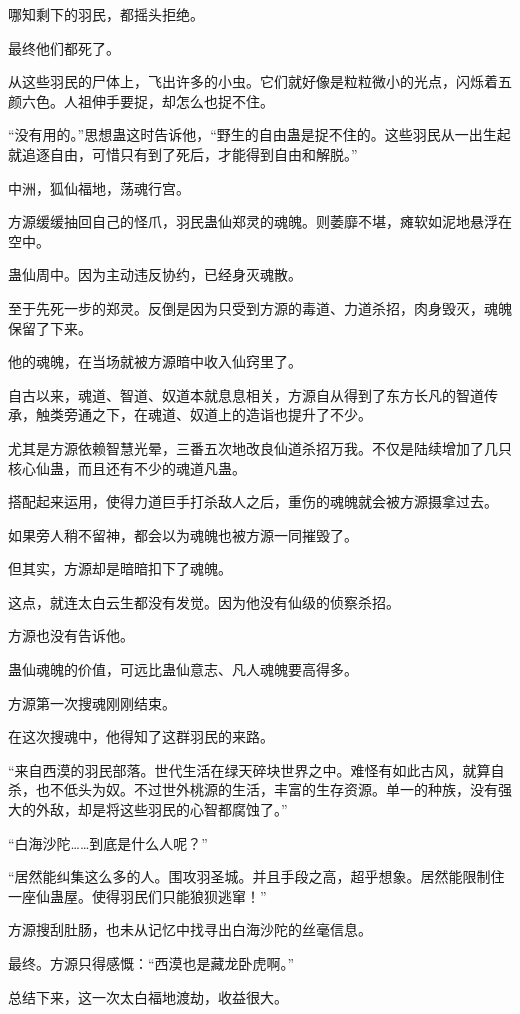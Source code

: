 \begin{this_body}
哪知剩下的羽民，都摇头拒绝。

最终他们都死了。

从这些羽民的尸体上，飞出许多的小虫。它们就好像是粒粒微小的光点，闪烁着五颜六色。人祖伸手要捉，却怎么也捉不住。

“没有用的。”思想蛊这时告诉他，“野生的自由蛊是捉不住的。这些羽民从一出生起就追逐自由，可惜只有到了死后，才能得到自由和解脱。”

中洲，狐仙福地，荡魂行宫。

方源缓缓抽回自己的怪爪，羽民蛊仙郑灵的魂魄。则萎靡不堪，瘫软如泥地悬浮在空中。

蛊仙周中。因为主动违反协约，已经身灭魂散。

至于先死一步的郑灵。反倒是因为只受到方源的毒道、力道杀招，肉身毁灭，魂魄保留了下来。

他的魂魄，在当场就被方源暗中收入仙窍里了。

自古以来，魂道、智道、奴道本就息息相关，方源自从得到了东方长凡的智道传承，触类旁通之下，在魂道、奴道上的造诣也提升了不少。

尤其是方源依赖智慧光晕，三番五次地改良仙道杀招万我。不仅是陆续增加了几只核心仙蛊，而且还有不少的魂道凡蛊。

搭配起来运用，使得力道巨手打杀敌人之后，重伤的魂魄就会被方源摄拿过去。

如果旁人稍不留神，都会以为魂魄也被方源一同摧毁了。

但其实，方源却是暗暗扣下了魂魄。

这点，就连太白云生都没有发觉。因为他没有仙级的侦察杀招。

方源也没有告诉他。

蛊仙魂魄的价值，可远比蛊仙意志、凡人魂魄要高得多。

方源第一次搜魂刚刚结束。

在这次搜魂中，他得知了这群羽民的来路。

“来自西漠的羽民部落。世代生活在绿天碎块世界之中。难怪有如此古风，就算自杀，也不低头为奴。不过世外桃源的生活，丰富的生存资源。单一的种族，没有强大的外敌，却是将这些羽民的心智都腐蚀了。”

“白海沙陀……到底是什么人呢？”

“居然能纠集这么多的人。围攻羽圣城。并且手段之高，超乎想象。居然能限制住一座仙蛊屋。使得羽民们只能狼狈逃窜！”

方源搜刮肚肠，也未从记忆中找寻出白海沙陀的丝毫信息。

最终。方源只得感慨：“西漠也是藏龙卧虎啊。”

总结下来，这一次太白福地渡劫，收益很大。


\end{this_body}
